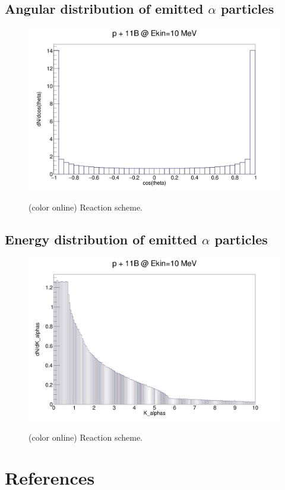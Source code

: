 \documentclass[aps,prc,twocolumn,floatfix,showpacs,a4paper,
nofootinbib,amsmath,amssymb]{revtex4}
\begin{document}
\subsection{Angular distribution of emitted $\alpha$ particles}
\begin{figure}[h!]
	\begin{center}
		\resizebox{0.98\columnwidth}{!}
		{\includegraphics{dNdcostheta.jpg}}
		\caption{ (color online)
			Reaction scheme.
		}
		\label{Reaction}
	\end{center}
\end{figure} 

\subsection{Energy distribution of emitted $\alpha$ particles}
\begin{figure}[h!]
	\begin{center}
		\resizebox{0.98\columnwidth}{!}
		{\includegraphics{dNdK.jpg}}
		\caption{ (color online)
			Reaction scheme.
		}
		\label{Reaction}
	\end{center}
\end{figure} 

\section{References}

\end{document}
